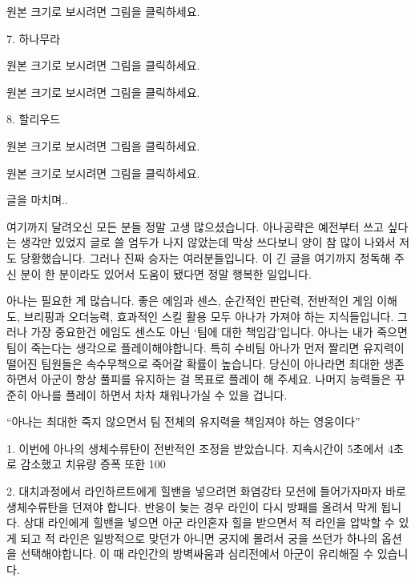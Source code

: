 원본 크기로 보시려면 그림을 클릭하세요.



7. 하나무라


원본 크기로 보시려면 그림을 클릭하세요.


원본 크기로 보시려면 그림을 클릭하세요.



8. 할리우드


원본 크기로 보시려면 그림을 클릭하세요.


원본 크기로 보시려면 그림을 클릭하세요.




글을 마치며..

 

여기까지 달려오신 모든 분들 정말 고생 많으셨습니다. 아나공략은 예전부터 쓰고 싶다는 생각만 있었지 글로 쓸 엄두가 나지 않았는데 막상 쓰다보니 양이 참 많이 나와서 저도 당황했습니다. 그러나 진짜 승자는 여러분들입니다. 이 긴 글을 여기까지 정독해 주신 분이 한 분이라도 있어서 도움이 됐다면 정말 행복한 일입니다. 


아나는 필요한 게 많습니다. 좋은 에임과 센스, 순간적인 판단력, 전반적인 게임 이해도, 브리핑과 오더능력, 효과적인 스킬 활용 모두 아나가 가져야 하는 지식들입니다. 그러나 가장 중요한건 에임도 센스도 아닌  ‘팀에 대한 책임감’입니다. 아나는 내가 죽으면 팀이 죽는다는 생각으로 플레이해야합니다. 특히 수비팀 아나가 먼저 짤리면 유지력이 떨어진 팀원들은 속수무책으로 죽어갈 확률이 높습니다. 당신이 아나라면 최대한 생존하면서 아군이 항상 풀피를 유지하는 걸 목표로 플레이 해 주세요. 나머지 능력들은 꾸준히 아나를 플레이 하면서 차차 채워나가실 수 있을 겁니다. 



“아나는 최대한 죽지 않으면서 팀 전체의 유지력을 책임져야 하는 영웅이다”

1. 이번에 아나의 생체수류탄이 전반적인 조정을 받았습니다. 지속시간이 5초에서 4초로 감소했고 치유량 증폭 또한 100%

 



2. 대치과정에서 라인하르트에게 힐밴을 넣으려면 화염강타 모션에 들어가자마자 바로 생체수류탄을 던져야 합니다. 반응이 늦는 경우 라인이 다시 방패를 올려서 막게 됩니다. 상대 라인에게 힐밴을 넣으면 아군 라인혼자 힐을 받으면서 적 라인을 압박할 수 있게 되고 적 라인은 일방적으로 맞던가 아니면 궁지에 몰려서 궁을 쓰던가 하나의 옵션을 선택해야합니다. 이 때 라인간의 방벽싸움과 심리전에서 아군이 유리해질 수 있습니다.

